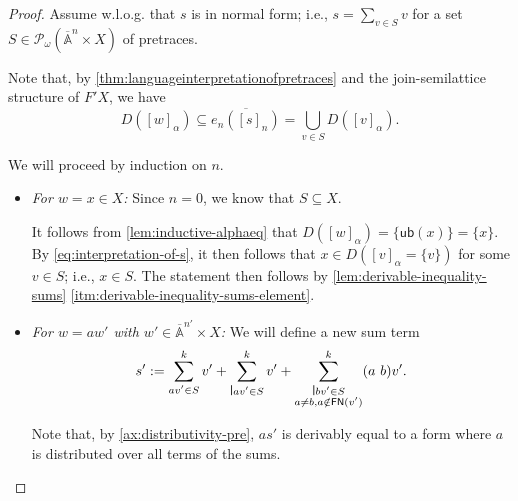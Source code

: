 \documentclass[11pt,a4paper]{amsart}
\newcommand{\FN}{\mathsf{FN}}
\newcommand{\Names}{\mathbb{A}}
\newcommand{\barNames}{\overline{\Names}}
\newcommand{\pow}{\mathcal{P}}
\newcommand{\powf}{\pow_{\omega}}
\theoremstyle{plain}
\newcommand{\midmid}{\hspace{0.2ex}{\rule[-0.1ex]{0.6pt}{1.65ex}}\hspace{0.2ex}}
\newcommand{\newletter}[1]{{\midmid}#1}
\newcommand{\ub}{\mathsf{ub}}
\numberwithin{equation}{section}
\newcommand{\+}[1]{\mathcal{#1}\xspace}
\theoremstyle{definition}
\begin{document}
\begin{proof}
  Assume w.l.o.g. that \(s\) is in normal form; i.e., \(s = \sum_{v \in S} v\) for a set \(S \in \powf(\barNames^n \times X)\) of pretraces.

  Note that, by \cref{thm:languageinterpretationofpretraces} and the join-semilattice structure of \(F' X\), we have
  \begin{equation}\label{eq:interpretation-of-s}
    D([w]_\alpha) \subseteq \overline{e_n([s]_n)} = \bigcup_{v \in S} D([v]_\alpha).
  \end{equation}

  We will proceed by induction on \(n\).
  \begin{itemize}
      \item \emph{For \(w = x \in X\):}
        Since \(n = 0\), we know that \(S \subseteq X\).

        It follows from \cref{lem:inductive-alphaeq} that \(D([w]_\alpha) = \{ \ub(x) \} = \{x\}\).
        By \eqref{eq:interpretation-of-s}, it then follows that \(x \in D([v]_\alpha = \{v\})\) for some \(v \in S\); i.e., \(x \in S\).
        The statement then follows by \cref{lem:derivable-inequality-sums} \eqref{itm:derivable-inequality-sums-element}.
      \item \emph{For \(w = aw'\) with \(w' \in \barNames^{n'} \times X\):}
        We will define a new sum term
        \begin{equation*}
          s' :=
            \sum_{\substack{av' \in S}}^k v' +
            \sum_{\substack{\newletter{a}v' \in S}}^k v' +
            \sum_{\substack{\newletter{b}v' \in S \\ a \neq b, a \notin \FN(v')}}^k (a\ b)v'.
        \end{equation*}

        Note that, by \eqref{ax:distributivity-pre}, \(as'\) is derivably equal to a form where \(a\) is distributed over all terms of the sums.


\end{itemize}
\end{proof}
\end{document}
